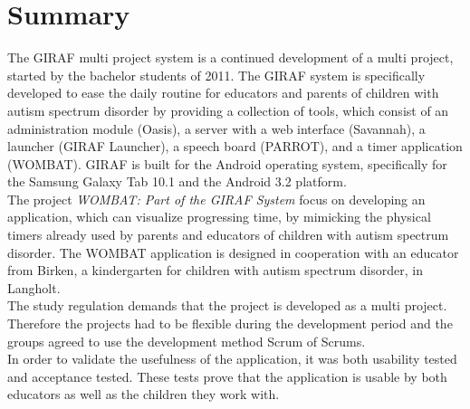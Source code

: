 \chapter*{Summary}
The GIRAF multi project system is a continued development of a multi project, started by the bachelor students of 2011. The GIRAF system is specifically developed to ease the daily routine for educators and parents of children with autism spectrum disorder by providing a collection of tools, which consist of an administration module (Oasis), a server with a web interface (Savannah), a launcher (GIRAF Launcher), a speech board (PARROT), and a timer application (WOMBAT). GIRAF is built for the Android\texttrademark \hspace{0.1cm} operating system, specifically for the Samsung Galaxy Tab 10.1 and the Android 3.2 platform.\\

   The project \textit{WOMBAT: Part of the GIRAF System} focus on developing an application, which can visualize progressing time, by mimicking the physical timers already used by parents and educators of children with autism spectrum disorder. The WOMBAT application is designed in cooperation with an educator from Birken, a kindergarten for children with autism spectrum disorder, in Langholt.\\
	
	The study regulation demands that the project is developed as a multi project. Therefore the projects had to be flexible during the development period and the groups agreed to use the development method Scrum of Scrums.\\

   In order to validate the usefulness of the application, it was both usability tested and acceptance tested. These tests prove that the application is usable by both educators as well as the children they work with.
\clearpage